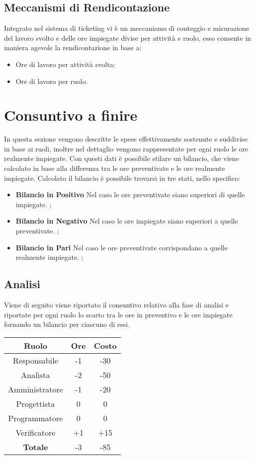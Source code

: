 \documentclass{scalatekids-article}
\begin{document}
\subsection{Meccanismi di Rendicontazione}
Integrato nel sistema di ticketing vi è un meccanismo di conteggio e misurazione del lavoro svolto
e delle ore impiegate divise per attività e ruolo, esso consente in maniera agevole la rendicontazione
in base a:
\begin{itemize}
  \item{Ore di lavoro per attività svolta;}
  \item{Ore di lavoro per ruolo.}
\end{itemize}
\newpage
\section{Consuntivo a finire}
In questa sezione vengono descritte le spese effettivamente sostenute e suddivise in base ai ruoli,
inoltre nel dettaglio vengono rappresentate per ogni ruolo le ore realmente impiegate. Con questi
dati è possibile stilare un bilancio, che viene calcolato in base alla differenza tra le ore preventivate
e le ore realmente impiegate. 
Calcolato il bilancio è possibile trovarsi in tre stati, nello specifico:
\begin{itemize}
  \item{\textbf{Bilancio in  Positivo} Nel caso le ore preventivate siano superiori di quelle impiegate. ;}
  \item{\textbf{Bilancio in  Negativo} Nel caso le ore impiegate siano superiori a quelle preventivate. ;}
  \item{\textbf{Bilancio in Pari} Nel caso le ore preventivate corrispondano a quelle realmente impiegate. ;}
\end{itemize}
\subsection{Analisi}
Viene di seguito viene riportato il consuntivo relativo alla fase di analisi e riportate per ogni ruolo lo
scarto tra le ore in preventivo e le ore impiegate fornando un bilancio per ciascuno di essi.
\begin{center}
  \normalsize
  \begin{tabular}{| c | c | c |}
    \hline
    \textbf{Ruolo} & \textbf{Ore} & \textbf{Costo}\\
    \hline
    Responsabile & -1 & -30 \\
    Analista & -2 & -50\\
    Amministratore & -1 & -20\\
    Progettista & 0 & 0\\
    Programmatore & 0 & 0\\
    Verificatore & +1 & +15\\
    \hline
    \textbf{Totale} & -3 & -85\\
    \hline
  \end{tabular}
\end{center}
\end{document}
